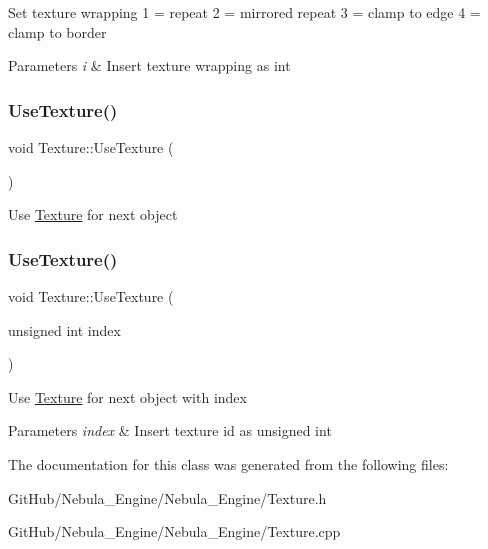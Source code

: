 Set texture wrapping 1 = repeat 2 = mirrored repeat 3 = clamp to edge 4 = clamp to border 
\begin{DoxyParams}{Parameters}
{\em i} & Insert texture wrapping as int \\
\hline
\end{DoxyParams}
\mbox{\label{class_texture_a2cad441d204e64021515dffe8b0a5613}} 
\subsubsection{\texorpdfstring{UseTexture()}{UseTexture()}\hspace{0.1cm}{\footnotesize\ttfamily [1/2]}}
{\footnotesize\ttfamily void Texture\+::\+Use\+Texture (\begin{DoxyParamCaption}{ }\end{DoxyParamCaption})}

Use \mbox{\hyperlink{class_texture}{Texture}} for next object \mbox{\label{class_texture_a28f5689771fd3ef57234b809854ede42}} 
\subsubsection{\texorpdfstring{UseTexture()}{UseTexture()}\hspace{0.1cm}{\footnotesize\ttfamily [2/2]}}
{\footnotesize\ttfamily void Texture\+::\+Use\+Texture (\begin{DoxyParamCaption}\item[{unsigned int}]{index }\end{DoxyParamCaption})}

Use \mbox{\hyperlink{class_texture}{Texture}} for next object with index 
\begin{DoxyParams}{Parameters}
{\em index} & Insert texture id as unsigned int \\
\hline
\end{DoxyParams}


The documentation for this class was generated from the following files\+:\begin{DoxyCompactItemize}
\item 
Git\+Hub/\+Nebula\+\_\+\+Engine/\+Nebula\+\_\+\+Engine/Texture.\+h\item 
Git\+Hub/\+Nebula\+\_\+\+Engine/\+Nebula\+\_\+\+Engine/Texture.\+cpp\end{DoxyCompactItemize}
